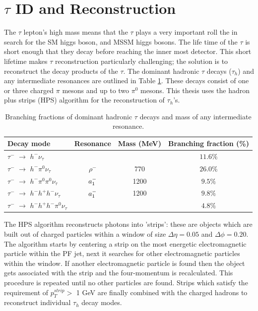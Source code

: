 \section{$\tau$ ID and Reconstruction}
The $\tau$ lepton's high mass means that the $\tau$ plays a very important
roll the in search for the SM higgs boson, and MSSM higgs bosons.
The life time of the $\tau$ is short enough that they decay before reaching the inner
most detector. This short lifetime makes $\tau$ reconstruction particularly challenging;
the solution is to reconstruct the decay products of the $\tau$. 
The dominant hadronic $\tau$ decays ($\tau_{h}$) 
and any intermediate resonances are 
outlined in Table \ref{tab:decay_modes}. 
These decays consist of one or three charged $\pi$ mesons and up to two $\pi^{0}$ mesons.
This thesis uses the hadron plus strips (HPS) algorithm for the reconstruction of 
$\tau_{h}$'s. %
\begin{table}[b]
\begin{center}
\begin{tabular}{|l|c|c|c|}
\hline
Decay mode & Resonance & Mass (MeV) &  Branching fraction (\%) \\
\hline
$\tau^{-}$  $\rightarrow $  $h^{-} \nu_{\tau}$ &  &  & $11.6\%$ \\
$\tau^{-}$  $\rightarrow $  $h^{-} \pi^{0}  \nu_{\tau}$ & $\rho^{-}$ & 770 & $26.0\%$ \\
$\tau^{-}$  $\rightarrow $  $h^{-} \pi^{0}\pi^{0}  \nu_{\tau}$ & $a_{\rm{1}}^{-}$ & 1200 & $9.5\%$ \\
$\tau^{-}$  $\rightarrow $  $h^{-} h^{+} h^{-} \nu_{\tau}$ & $a_{\rm{1}}^{-}$  & 1200 & $9.8\%$ \\
$\tau^{-}$  $\rightarrow $  $h^{-} h^{+} h^{-}\pi^{0}  \nu_{\tau}$ & & & $4.8\%$ \\
      \hline
\end{tabular}
\caption{
   Branching fractions of dominant hadronic $\tau$ decays and mass of any intermediate resonance. 
   }
\label{tab:decay_modes}
\end{center}
\end{table}

The HPS algorithm 
reconstructs photons into 'strips': these are objects which are built
out of charged particles within a window of size $\Delta\eta=0.05$
and $\Delta\phi=0.20$. The algorithm starts by centering a strip on the
most energetic electromagnetic particle within the PF jet, next it searches
for other electromagnetic particles within the window. If another electromagnetic
particle is found then the object gets associated with the strip and
the four-momentum is recalculated. This procedure is repeated until no other
particles are found. Strips which satisfy the requirement of $p_{T}^{strip}>$ 1 GeV 
are finally combined with the charged hadrons to reconstruct individual
$\tau_{h}$ decay modes.


